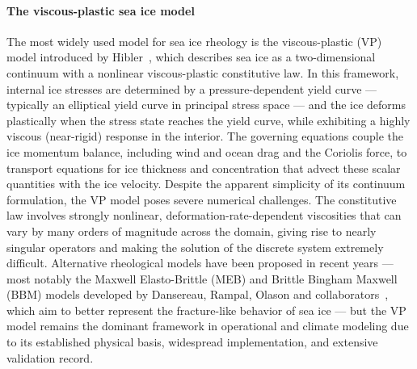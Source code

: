 \documentclass[11pt]{article}
\begin{document}
\paragraph{The viscous-plastic sea ice model}
The most widely used model for sea ice rheology is the viscous-plastic (VP) model introduced by Hibler~\cite{Hibler1979,Hibler1980}, which describes sea ice as a two-dimensional continuum with a nonlinear viscous-plastic constitutive law. In this framework, internal ice stresses are determined by a pressure-dependent yield curve --- typically an elliptical yield curve in principal stress space --- and the ice deforms plastically when the stress state reaches the yield curve, while exhibiting a highly viscous (near-rigid) response in the interior. The governing equations couple the ice momentum balance, including wind and ocean drag and the Coriolis force, to transport equations for ice thickness and concentration that advect these scalar quantities with the ice velocity. Despite the apparent simplicity of its continuum formulation, the VP model poses severe numerical challenges. The constitutive law involves strongly nonlinear, deformation-rate-dependent viscosities that can vary by many orders of magnitude across the domain, giving rise to nearly singular operators and making the solution of the discrete system extremely difficult. Alternative rheological models have been proposed in recent years — most notably the Maxwell Elasto-Brittle (MEB) and Brittle Bingham Maxwell (BBM) models developed by Dansereau, Rampal, Olason and collaborators~\cite{Dansereau2016,Rampal2016,Olason2022}, which aim to better represent the fracture-like behavior of sea ice — but the VP model remains the dominant framework in operational and climate modeling due to its established physical basis, widespread implementation, and extensive validation record.
\end{document}
